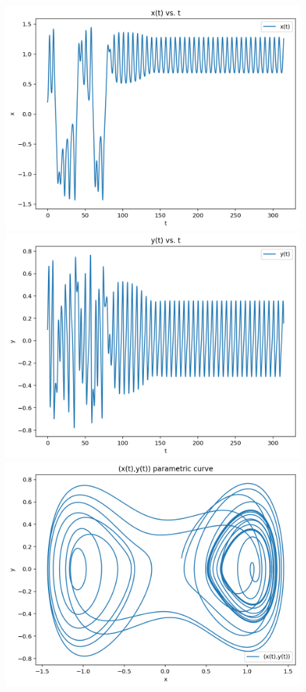 \documentclass{article}
\begin{document}
\begin{figure}[h!]
\includegraphics[scale=0.4]{x(t)3.png}
\includegraphics[scale=0.4]{y(t)3.png}
\includegraphics[scale=0.4]{parametriccurve3.png}

\end{figure}
\end{document}

